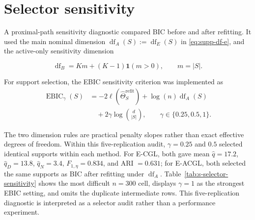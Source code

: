 \documentclass[preprint,12pt,authoryear]{elsarticle}
\begin{document}
\section{Selector sensitivity}
\label{sec:s-selector-sensitivity}

A proximal-path sensitivity diagnostic compared BIC before and after
refitting. It used the main nominal dimension
$\operatorname{df}_A(S):=\operatorname{df}_E(S)$ in
\eqref{eq:supp-df-e},
and the active-only sensitivity dimension

\[
\operatorname{df}_B=Km+(K-1)\mathbf 1(m>0),
\qquad m=|S|.
\]

\begin{samepage}
For support selection, the EBIC sensitivity criterion
\citep{chen2008ebic} was implemented as
\[
\begin{aligned}
\operatorname{EBIC}_{\gamma}(S)
&=-2\ell\!\left(\widehat\Theta_S^{\mathrm{refit}}\right)
+\log(n)\operatorname{df}_A(S)\\
&\quad+2\gamma\log\binom{d}{|S|},
\qquad \gamma\in\{0.25,0.5,1\}.
\end{aligned}
\]
\end{samepage}
The two dimension rules are practical penalty slopes rather than exact
effective degrees of freedom. Within this five-replication audit,
$\gamma=0.25$ and $0.5$ selected identical supports within each method. For
E-CGL, both gave mean $\widehat q=17.2$, $\widehat q_D=13.8$,
$\widehat q_N=3.4$, $F_{1,\eta}=0.834$, and ARI $=0.631$; for E-ACGL, both
selected the same supports as BIC after refitting under
$\operatorname{df}_A$. Table~\ref{tab:s-selector-sensitivity} shows the most
difficult $n=300$ cell, displays $\gamma=1$ as the strongest EBIC setting,
and omits the duplicate intermediate rows. This five-replication diagnostic
is interpreted as a selector audit rather than a performance experiment.
\end{document}
